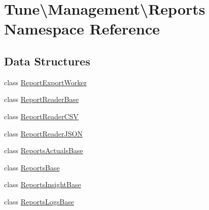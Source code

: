 \hypertarget{namespaceTune_1_1Management_1_1Reports}{\section{Tune\textbackslash{}Management\textbackslash{}Reports Namespace Reference}
\label{namespaceTune_1_1Management_1_1Reports}
}
\subsection*{Data Structures}
\begin{DoxyCompactItemize}
\item 
class \hyperlink{classTune_1_1Management_1_1Reports_1_1ReportExportWorker}{Report\-Export\-Worker}
\item 
class \hyperlink{classTune_1_1Management_1_1Reports_1_1ReportReaderBase}{Report\-Reader\-Base}
\item 
class \hyperlink{classTune_1_1Management_1_1Reports_1_1ReportReaderCSV}{Report\-Reader\-C\-S\-V}
\item 
class \hyperlink{classTune_1_1Management_1_1Reports_1_1ReportReaderJSON}{Report\-Reader\-J\-S\-O\-N}
\item 
class \hyperlink{classTune_1_1Management_1_1Reports_1_1ReportsActualsBase}{Reports\-Actuals\-Base}
\item 
class \hyperlink{classTune_1_1Management_1_1Reports_1_1ReportsBase}{Reports\-Base}
\item 
class \hyperlink{classTune_1_1Management_1_1Reports_1_1ReportsInsightBase}{Reports\-Insight\-Base}
\item 
class \hyperlink{classTune_1_1Management_1_1Reports_1_1ReportsLogsBase}{Reports\-Logs\-Base}
\end{DoxyCompactItemize}
